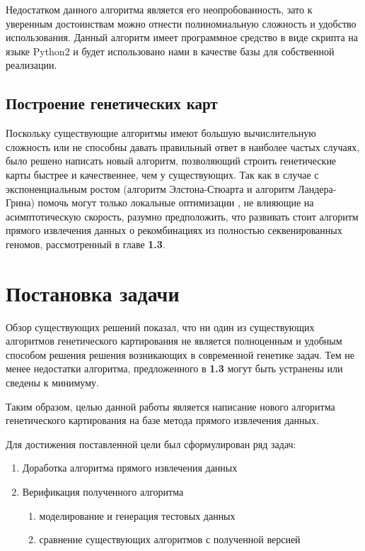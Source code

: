 \documentclass{matmex-diploma-custom}
\begin{document}
Недостатком данного алгоритма является его неопробованность, зато к
уверенным достоинствам можно отнести полиномиальную сложность и
удобство использования. Данный алгоритм имеет программное средство в
виде скрипта на языке Python2 и будет использовано нами в качестве
базы для собственной реализации.

\subsection*{Построение генетических карт}

Поскольку существующие алгоритмы имеют большую вычислительную
сложность или не способны давать правильный ответ в наиболее частых случаях,
было решено написать новый алгоритм, позволяющий строить генетические
карты быстрее и качественнее, чем у существующих. Так как в случае с
экспоненциальным ростом (алгоритм Элстона-Стюарта и алгоритм
Ландера-Грина) помочь могут только локальные оптимизации
\cite{o2001rapid, fishelson2002exact, fishelson2004optimizing}, не влияющие на
асимптотическую скорость, разумно предположить, что развивать стоит
алгоритм прямого извлечения данных о рекомбинациях из полностью
секвенированных геномов, рассмотренный в главе \textbf{1.3}.

\section{Постановка задачи}

Обзор существующих решений показал, что ни один из существующих
алгоритмов генетического картирования не является полноценным и
удобным способом решения решения возникающих в современной генетике
задач. Тем не менее недостатки алгоритма, предложенного в \textbf{1.3}
могут быть устранены или сведены к минимуму.

Таким образом, целью данной работы является написание нового алгоритма
генетического картирования на базе метода прямого извлечения данных.

\bigskip

Для достижения поставленной цели был сформулирован ряд задач:

\begin{enumerate}
\item Доработка алгоритма прямого извлечения данных
\item Верификация полученного алгоритма
  \begin{enumerate}
  \item моделирование и генерация тестовых
    данных
  \item сравнение существующих алгоритмов с полученной версией
  \end{enumerate}
\end{enumerate}
\end{document}
